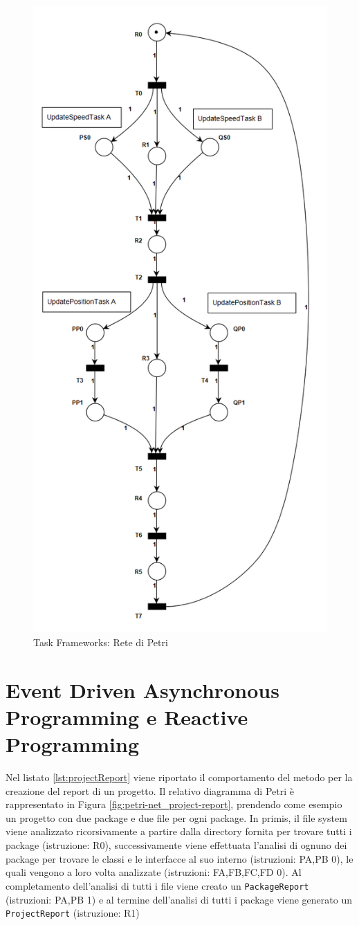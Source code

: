 \documentclass[12pt,a4paper,openright,twoside]{book}
\begin{document}
\begin{figure}[H]
	\centering
	\includegraphics[width=0.7\linewidth]{figures/petri-net_task-frameworks.png}
	\caption{Task Frameworks: Rete di Petri}
	\label{fig:petri-net_task-frameworks}
\end{figure}


\section{Event Driven Asynchronous Programming e Reactive Programming}

Nel listato \ref{lst:projectReport} viene riportato il comportamento del metodo per la creazione del report di un progetto. Il relativo diagramma di Petri è rappresentato in Figura \ref{fig:petri-net_project-report}, prendendo come esempio un progetto con due package e due file per ogni package.
In primis, il file system viene analizzato ricorsivamente a partire dalla directory fornita per trovare tutti i package (istruzione: R0), successivamente viene effettuata l'analisi di ognuno dei package per trovare le classi e le interfacce al suo interno (istruzioni: PA,PB 0), le quali vengono a loro volta analizzate (istruzioni: FA,FB,FC,FD 0). Al completamento dell'analisi di tutti i file viene creato un \texttt{PackageReport} (istruzioni: PA,PB 1) e al termine dell'analisi di tutti i package viene generato un \texttt{ProjectReport} (istruzione: R1)
\end{document}
